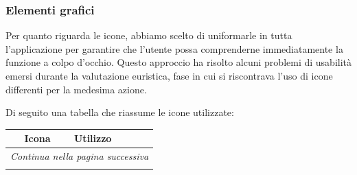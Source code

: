 \subsubsection{Elementi grafici}
Per quanto riguarda le icone, abbiamo scelto di uniformarle in tutta l'applicazione per garantire che l'utente possa comprenderne immediatamente la funzione a colpo d'occhio. Questo approccio ha risolto alcuni problemi di usabilità emersi durante la valutazione euristica, fase in cui si riscontrava l'uso di icone differenti per la medesima azione.

\noindent
Di seguito una tabella che riassume le icone utilizzate:
\begin{longtable}{|c|p{10cm}|}
	\hline
	\textbf{Icona} & \textbf{Utilizzo} \\ \hline
	\endhead %
	
	\hline
	\multicolumn{2}{r}{\textit{Continua nella pagina successiva}} \\ 
	\endfoot %
	
	\hline
	\endlastfoot %
	

\end{longtable}
